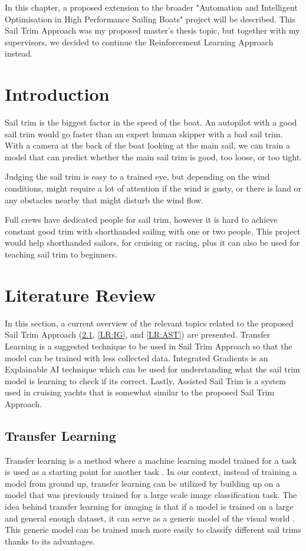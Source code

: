 In this chapter, a proposed extension to the broader "Automation and Intelligent Optimisation in High Performance Sailing Boats" project will be described. This Sail Trim Approach was my proposed master's thesis topic, but together with my supervisors, we decided to continue the Reinforcement Learning Approach instead.

\section{Introduction}
Sail trim is the biggest factor in the speed of the boat. An autopilot with a good sail trim would go faster than an expert human skipper with a bad sail trim. With a camera at the back of the boat looking at the main sail, we can train a model that can predict whether the main sail trim is good, too loose, or too tight.

Judging the sail trim is easy to a trained eye, but depending on the wind conditions, might require a lot of attention if the wind is gusty, or there is land or any obstacles nearby that might disturb the wind flow.
 
Full crews have dedicated people for sail trim, however it is hard to achieve constant good trim with shorthanded sailing with one or two people. This project would help shorthanded sailors, for cruising or racing, plus it can also be used for teaching sail trim to beginners.


\section{Literature Review}
In this section, a current overview of the relevant topics related to the proposed Sail Trim Approach (\ref{LR:TL}, \ref{LR:IG}, and \ref{LR:AST}) are presented. Transfer Learning is a suggested technique to be used in Sail Trim Approach so that the model can be trained with less collected data. Integrated Gradients is an Explainable AI technique which can be used for understanding what the sail trim model is learning to check if its correct. Lastly, Assisted Sail Trim is a system used in cruising yachts that is somewhat similar to the proposed Sail Trim Approach.

\subsection{Transfer Learning} \label{LR:TL}
Transfer learning is a method where a machine learning model trained for a task is used as a starting point for another task \cite{brownlee_2019}. In our context, instead of training a model from ground up, transfer learning can be utilized by building up on a model that was previously trained for a large scale image classification task. The idea behind transfer learning for imaging is that if a model is trained on a large and general enough dataset, it can serve as a generic model of the visual world \cite{TF:TL}. This generic model can be trained much more easily to classify different sail trims thanks to its advantages. 

